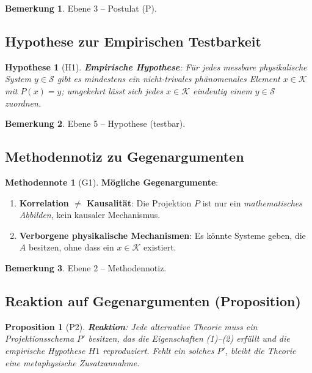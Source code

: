 \documentclass[11pt,a4paper]{article}
\theoremstyle{definition}
\newtheorem{remark}{Bemerkung}[section]
\newtheorem{methodennote}{Methodennote}[section]
\theoremstyle{plain}
\newtheorem{proposition}{Proposition}[section]
\newtheorem{hypothesis}{Hypothese}[section]
\begin{document}
\begin{remark}
Ebene 3 – Postulat (P).
\end{remark}

\subsection{Hypothese zur Empirischen Testbarkeit}
\begin{hypothesis}[H1]
\textbf{Empirische Hypothese}: Für jedes messbare physikalische
System $y\in\mathcal{S}$ gibt es mindestens ein nicht-trivales
phänomenales Element $x\in\mathcal{K}$ mit $P(x)=y$; umgekehrt lässt
sich jedes $x\in\mathcal{K}$ eindeutig einem $y\in\mathcal{S}$ zuordnen.
\end{hypothesis}

\begin{remark}
Ebene 5 – Hypothese (testbar).
\end{remark}

\subsection{Methodennotiz zu Gegenargumenten}
\begin{methodennote}[G1]
\textbf{Mögliche Gegenargumente}:
\begin{enumerate}[label=(\alph*)]
  \item \textbf{Korrelation $\neq$ Kausalität}: Die Projektion $P$ ist
        nur ein \emph{mathematisches Abbilden}, kein kausaler
        Mechanismus.
  \item \textbf{Verborgene physikalische Mechanismen}: Es könnte
        Systeme geben, die $A$ besitzen, ohne dass ein $x\in\mathcal{K}$
        existiert.
\end{enumerate}
\end{methodennote}

\begin{remark}
Ebene 2 – Methodennotiz.
\end{remark}

\subsection{Reaktion auf Gegenargumenten (Proposition)}
\begin{proposition}[P2]
\textbf{Reaktion}: Jede alternative Theorie muss ein
\emph{Projektionsschema} $P'$ besitzen, das die Eigenschaften (1)–(2)
erfüllt und die empirische Hypothese $H1$ reproduziert. Fehlt ein
solches $P'$, bleibt die Theorie eine metaphysische Zusatzannahme.
\end{proposition}
\end{document}
